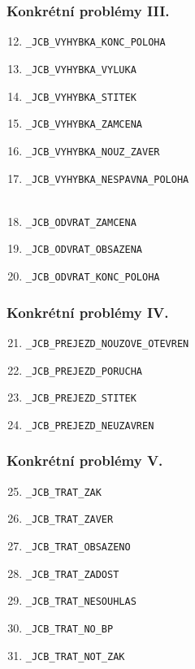 \documentclass[czech]{beamer}
\begin{document}

\begin{frame}[fragile]
\frametitle{Konkrétní problémy III.}
\begin{enumerate}
\setcounter{enumi}{11}
\item \verb+_JCB_VYHYBKA_KONC_POLOHA+
\item \verb+_JCB_VYHYBKA_VYLUKA+
\item \verb+_JCB_VYHYBKA_STITEK+
\item \verb+_JCB_VYHYBKA_ZAMCENA+
\item \verb+_JCB_VYHYBKA_NOUZ_ZAVER+
\item \verb+_JCB_VYHYBKA_NESPAVNA_POLOHA+ \\~\\
\item \verb+_JCB_ODVRAT_ZAMCENA+
\item \verb+_JCB_ODVRAT_OBSAZENA+
\item \verb+_JCB_ODVRAT_KONC_POLOHA+
\end{enumerate}
\end{frame}


\begin{frame}[fragile]
\frametitle{Konkrétní problémy IV.}
\begin{enumerate}
\setcounter{enumi}{20}
\item \verb+_JCB_PREJEZD_NOUZOVE_OTEVREN+
\item \verb+_JCB_PREJEZD_PORUCHA+
\item \verb+_JCB_PREJEZD_STITEK+
\item \verb+_JCB_PREJEZD_NEUZAVREN+
\end{enumerate}
\end{frame}


\begin{frame}[fragile]
\frametitle{Konkrétní problémy V.}
\begin{enumerate}
\setcounter{enumi}{24}
\item \verb+_JCB_TRAT_ZAK+
\item \verb+_JCB_TRAT_ZAVER+
\item \verb+_JCB_TRAT_OBSAZENO+
\item \verb+_JCB_TRAT_ZADOST+
\item \verb+_JCB_TRAT_NESOUHLAS+
\item \verb+_JCB_TRAT_NO_BP+
\item \verb+_JCB_TRAT_NOT_ZAK+
\end{enumerate}
\end{frame}
\end{document}
